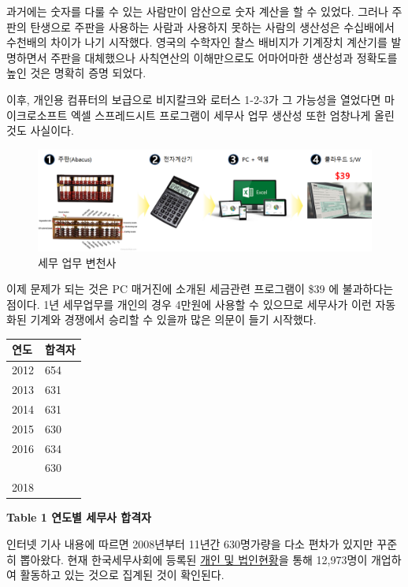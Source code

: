 \documentclass[smallextended]{svjour3}       %
\begin{document}
과거에는 숫자를 다룰 수 있는 사람만이 암산으로 숫자 계산을 할 수 있었다.
그러나 주판의 탄생으로 주판을 사용하는 사람과 사용하지 못하는 사람의
생산성은 수십배에서 수천배의 차이가 나기 시작했다. 영국의 수학자인 찰스
배비지가 기계장치 계산기를 발명하면서 주판을 대체했으나 사칙연산의
이해만으로도 어마어마한 생산성과 정확도를 높인 것은 명확히 증명 되었다.

이후, 개인용 컴퓨터의 보급으로 비지칼크와 로터스 1-2-3가 그 가능성을
열었다면 마이크로소프트 엑셀 스프레드시트 프로그램이 세무사 업무 생산성
또한 엄창나게 올린 것도 사실이다.

\begin{figure}

{\centering \includegraphics[width=1\linewidth]{fig/tax-preparation} 

}

\caption{세무 업무 변천사}\label{fig:unnamed-chunk-1}
\end{figure}

이제 문제가 되는 것은 PC 매거진\cite{yakal_2020}에 소개된 세금관련
프로그램이 \$39 에 불과하다는 점이다. 1년 세무업무를 개인의 경우 4만원에
사용할 수 있으므로 세무사가 이런 자동화된 기계와 경쟁에서 승리할 수
있을까 많은 의문이 들기 시작했다.

\begin{tabular}{ll}
\toprule
연도 & 합격자\\
\midrule
2012 & 654\\
2013 & 631\\
2014 & 631\\
2015 & 630\\
2016 & 634\\
\addlinespace
2017 & 630\\
2018 & \\
\bottomrule
\end{tabular}

\textbf{Table 1 연도별 세무사 합격자}

인터넷 기사 \cite{tax_2019} 내용에 따르면 2008년부터 11년간 630명가량을
다소 편차가 있지만 꾸준히 뽑아왔다. 현재 한국세무사회에 등록된
\href{http://www.kacpta.or.kr/}{개인 및 법인현황}을 통해 12,973명이
개업하여 활동하고 있는 것으로 집계된 것이 확인된다.
\end{document}
